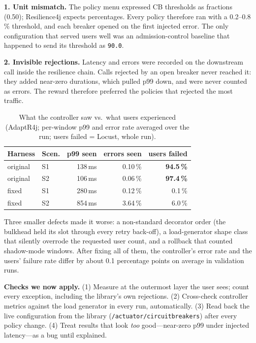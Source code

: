\documentclass[journal]{IEEEtran}
\newcommand{\adaptr}{AdaptR4j\xspace}
\newcommand{\rFJ}{Resilience4j\xspace}
\begin{document}
\textbf{1. Unit mismatch.} The policy menu expressed CB thresholds as fractions (0.50); \rFJ
expects percentages. Every policy therefore ran with a 0.2--0.8\,\% threshold, and each breaker
opened on the first injected error. The only configuration that served users well was an
admission-control baseline that happened to send its threshold as \texttt{90.0}.

\textbf{2. Invisible rejections.} Latency and errors were recorded on the downstream call
inside the resilience chain. Calls rejected by an open breaker never reached it: they added
near-zero durations, which pulled p99 down, and were never counted as errors. The reward
therefore preferred the policies that rejected the most traffic.

\begin{table}[t]
\centering
\small
\caption{What the controller saw vs.\ what users experienced (\adaptr; per-window p99 and error
  rate averaged over the run; users failed = Locust, whole run).}
\label{tab:measurement}
\begin{tabular}{llrrr}
\toprule
Harness & Scen. & p99 seen & errors seen & users failed \\
\midrule
original & S1 & 138\,ms & 0.10\,\% & \textbf{94.5\,\%} \\
original & S2 & 106\,ms & 0.06\,\% & \textbf{97.4\,\%} \\
fixed    & S1 & 280\,ms & 0.12\,\% & 0.1\,\% \\
fixed    & S2 & 854\,ms & 3.64\,\% & 6.0\,\% \\
\bottomrule
\end{tabular}
\end{table}

Three smaller defects made it worse: a non-standard decorator order (the bulkhead held its slot
through every retry back-off), a load-generator shape class that silently overrode the requested
user count, and a rollback that counted shadow-mode windows. After fixing all of them, the
controller's error rate and the users' failure rate differ by about 0.1 percentage points on
average in validation runs.

\textbf{Checks we now apply.} (1) Measure at the outermost layer the user sees; count every
exception, including the library's own rejections. (2) Cross-check controller metrics against
the load generator in every run, automatically. (3) Read back the live configuration from the
library (\texttt{/actuator/circuitbreakers}) after every policy change. (4) Treat results that
look \emph{too} good---near-zero p99 under injected latency---as a bug until explained.
\end{document}
